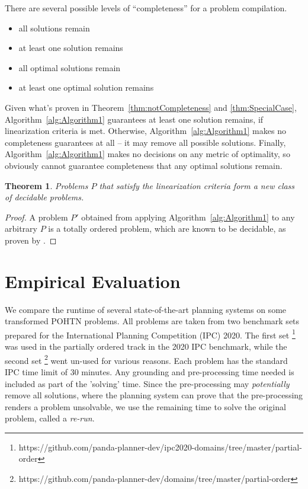 \documentclass[letterpaper]{article} %
\newtheorem{theorem}{Theorem}
\begin{document}
There are several possible levels of \enquote{completeness} for a problem compilation.
\begin{itemize}
	\item all solutions remain 
	\item at least one solution remains 
	\item all optimal solutions remain
	\item at least one optimal solution remains 	
\end{itemize}
Given what's proven in Theorem~\ref{thm:notCompleteness} and \ref{thm:SpecialCase}, Algorithm~\ref{alg:Algorithm1} guarantees at least one solution remains, if linearization criteria is met. Otherwise, Algorithm~\ref{alg:Algorithm1} makes no completeness guarantees at all -- it may remove all possible solutions. Finally, Algorithm~\ref{alg:Algorithm1} makes no decisions on any metric of optimality, so obviously cannot guarantee completeness that any optimal solutions remain.


\begin{theorem}\label{thm:newClass}
	Problems $P$ that satisfy the linearization criteria form a new class of decidable problems.
\end{theorem}
\begin{proof}
	A problem $P'$ obtained from applying Algorithm~\ref{alg:Algorithm1} to any arbitrary $P$ is a totally ordered problem, which are known to be decidable, as proven by \cite{Alford2015TightHTNBounds}.  
\end{proof}

 





\section{Empirical Evaluation}
We compare the runtime of several state-of-the-art planning systems on some transformed POHTN problems. All problems are taken from two benchmark sets prepared for the International Planning Competition (IPC) 2020. The first set \footnote{https://github.com/panda-planner-dev/ipc2020-domains/tree/master/partial-order} was used in the partially ordered track in the 2020 IPC benchmark, while the second set \footnote{https://github.com/panda-planner-dev/domains/tree/master/partial-order} went un-used for various reasons. Each problem has the standard IPC time limit of 30 minutes. Any grounding and pre-processing time needed is included as part of the 'solving' time. Since the pre-processing may \emph{potentially} remove all solutions, where the planning system can prove that the pre-processing renders a problem unsolvable, we use the remaining time to solve the original problem, called a \textit{re-run}.
\end{document}
